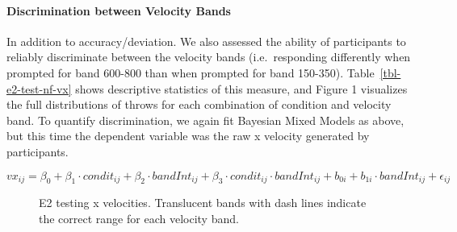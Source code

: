 \documentclass[
  letterpaper,
  DIV=11,
  numbers=noendperiod,
  oneside]{scrartcl}
\let\oldparagraph\paragraph
\renewcommand{\paragraph}[1]{\oldparagraph{#1}\mbox{}}
\begin{document}
\paragraph{Discrimination between Velocity
Bands}\label{discrimination-between-velocity-bands}

In addition to accuracy/deviation. We also assessed the ability of
participants to reliably discriminate between the velocity bands
(i.e.~responding differently when prompted for band 600-800 than when
prompted for band 150-350). Table~\ref{tbl-e2-test-nf-vx} shows
descriptive statistics of this measure, and Figure 1 visualizes the full
distributions of throws for each combination of condition and velocity
band. To quantify discrimination, we again fit Bayesian Mixed Models as
above, but this time the dependent variable was the raw x velocity
generated by participants.

\begin{equation}
vx_{ij} = \beta_0 + \beta_1 \cdot condit_{ij} + \beta_2 \cdot bandInt_{ij} + \beta_3 \cdot condit_{ij} \cdot bandInt_{ij} + b_{0i} + b_{1i} \cdot bandInt_{ij} + \epsilon_{ij}
\end{equation}

\begin{figure}


\caption{\label{fig-e2-test-vx}E2 testing x velocities. Translucent
bands with dash lines indicate the correct range for each velocity
band.}

\end{figure}%
\end{document}
